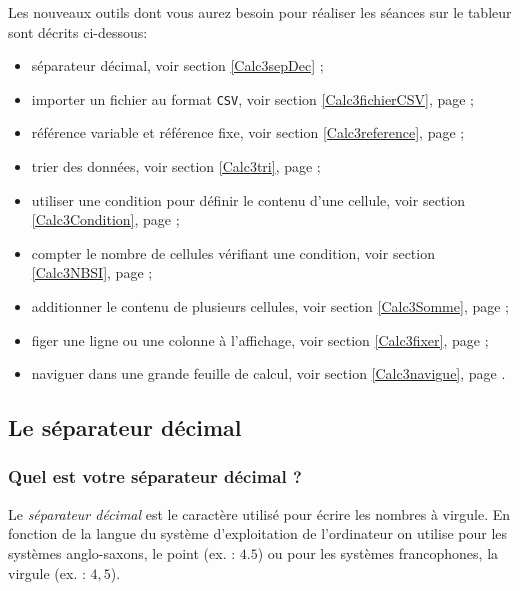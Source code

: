 Les nouveaux outils dont vous aurez besoin pour réaliser les séances sur le tableur sont décrits ci-dessous:
\begin{itemize}
	\item séparateur décimal, voir section \ref{Calc3sepDec} ;
	\item importer un fichier au format \texttt{CSV}, voir section \ref{Calc3fichierCSV}, page \pageref{Calc3fichierCSV} ;
	\item référence variable et référence fixe, voir section \ref{Calc3reference}, page \pageref{Calc3reference} ;
	\item trier des données, voir section \ref{Calc3tri}, page \pageref{Calc3tri} ;
	\item utiliser une condition pour définir le contenu d'une cellule, voir section \ref{Calc3Condition}, page \pageref{Calc3Condition} ;
	\item compter le nombre de cellules vérifiant une condition, voir section \ref{Calc3NBSI}, page \pageref{Calc3NBSI} ;
	\item additionner le contenu de plusieurs cellules, voir section \ref{Calc3Somme}, page \pageref{Calc3Somme} ;
	\item figer une ligne ou une colonne à l'affichage, voir section \ref{Calc3fixer}, page \pageref{Calc3fixer} ;
	\item naviguer dans une grande feuille de calcul, voir section \ref{Calc3navigue}, page \pageref{Calc3navigue}.
\end{itemize}




\subsection{Le séparateur décimal}\label{Calc3sepDec}

\subsubsection{Quel est votre séparateur décimal ?}


Le \emph{séparateur décimal} est le caractère utilisé pour écrire les nombres à virgule. En fonction de la langue du système d'exploitation de l'ordinateur on utilise pour les systèmes anglo-saxons, le point (ex. : $4.5$) ou pour les systèmes francophones, la virgule (ex. : $4,5$).

